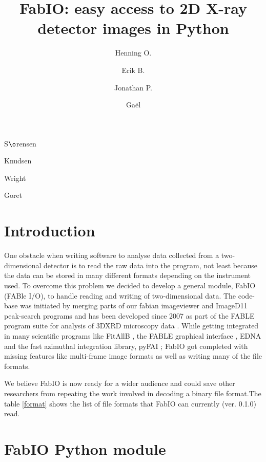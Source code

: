 \documentclass{iucr}
\begin{document}
\title{FabIO: easy access to 2D X-ray detector images in Python}

    \author[a]{Henning O.}{S$\o$rensen}
    \author[b]{Erik B.}{Knudsen}
    \author[c]{Jonathan P.}{Wright}
	\author[c]{Ga\"el}{Goret}

\maketitle

\section{Introduction}

One obstacle when writing software to analyse data collected from a
two-dimensional detector is to read the raw data into the program,
not least because the data can be stored in many different formats
depending on the instrument used.
To overcome this problem we decided to develop a general module,
FabIO (FABle I/O), to handle reading and writing of two-dimensional
data.
The code-base was initiated by merging parts of our fabian imageviewer
\cite{fabian} and ImageD11 \cite{ImageD11} peak-search programs and has
been developed since 2007 as part of the FABLE \cite{fable} program suite
for analysis of 3DXRD microscopy data \cite{3dxrd}.
While getting integrated in many scientific programs like FitAllB
\cite{fitallb}, the FABLE graphical interface \cite{fable}, EDNA \cite{edna} and
the fast azimuthal integration library, pyFAI \cite{pyfai}; FabIO got
completed with missing features like multi-frame image formats as well as
writing many of the file formats.

We believe FabIO is now ready for a wider audience and could save other
researchers from repeating the work involved in decoding a
binary file format.The table \ref{format} shows the list of file formats that
FabIO can currently (ver. 0.1.0) read.


\section{FabIO Python module}
\end{document}
